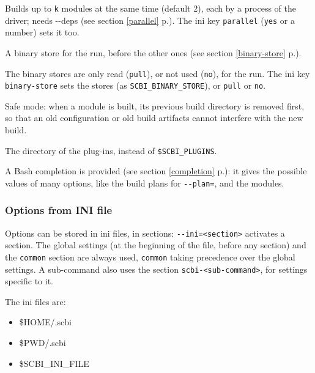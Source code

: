\documentclass[a4paper,12pt,twoside]{article}
\newcommand{\code}[1]{\texttt{#1}}
\newcommand{\seeref}[1]{see section \ref{#1} p.\pageref{#1}}
\newcommand{\ddash}{-{}-}
\begin{document}
\begin{description}[font=\texttt]
	\item[\ddash{}parallel{[}=<k>{]}] Builds up to \code{k} modules at the same time (default 2), each by a process of the driver; needs \ddash{}deps (\seeref{parallel}). The ini key \code{parallel} (\code{yes} or a number) sets it too.

	\item[\ddash{}binary-store=<url>] A binary store for the run, before the other ones (\seeref{binary-store}).

	\item[\ddash{}binary-store:{[}pull|no{]}] The binary stores are only read (\code{pull}), or not used (\code{no}), for the run. The ini key \code{binary-store} sets the stores (as \code{SCBI\_BINARY\_STORE}), or \code{pull} or \code{no}.

	\item[\ddash{}safe] Safe mode: when a module is built, its previous build directory is removed first, so that an old configuration or old build artifacts cannot interfere with the new build.

	\item[\ddash{}plugins=<directory>] The directory of the plug-ins, instead of \code{\$SCBI\_PLUGINS}.
\end{description}

A Bash completion is provided (\seeref{completion}): it gives the possible values of many options, like the build plans for \code{\ddash{}plan=}, and the modules.

\subsubsection{Options from INI file}
\label{inifile}

Options can be stored in ini files, in sections: \code{\ddash{}ini=<section>} activates a section. The global settings (at the beginning of the file, before any section) and the \code{common} section are always used, \code{common} taking precedence over the global settings. A sub-command also uses the section \code{scbi-<sub-command>}, for settings specific to it.

The ini files are:

\begin{itemize}
	\item \$HOME/.scbi
	\item \$PWD/.scbi
	\item \$SCBI\_INI\_FILE
\end{itemize}
\end{document}
